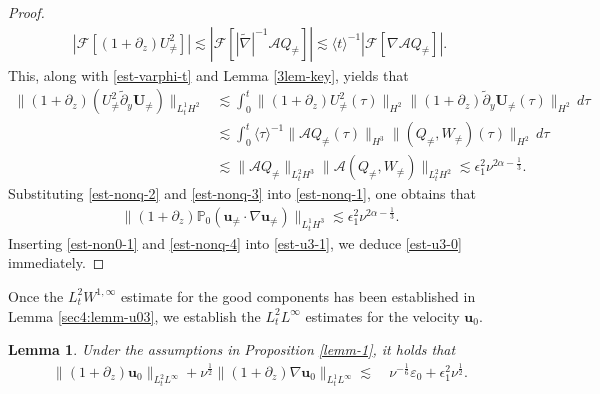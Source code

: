 \documentclass[11pt,reqno]{article}
\newtheorem{lemm}[theo]{Lemma}
\numberwithin{equation}{section}
\newcommand\PP{{\mathbb P}}
\newcommand\A{\mathcal{A}}
\newcommand\uu{\bm{u}}
\newcommand\U{\bm{U}}
\let\pa=\partial
\let\al=\alpha
\let\var=\varepsilon
\let\f=\frac
\let\ep=\epsilon
\begin{document}
\begin{proof}
\begin{align}
	|\mathcal{F}[(1+\pa_z)U^2_{\not=}]|
	\lesssim |\mathcal{F}[|\widetilde{\nabla}|^{-1}\A Q_{\not=}]|
	\lesssim \langle t\rangle^{-1}  |\mathcal{F}[\nabla\A Q_{\not=}]|.
\end{align}
This, along with %
\eqref{est-varphi-t} and Lemma \ref{3lem-key}, yields that
\begin{align}\label{est-nonq-3}
    \|(1+\pa_z)(U_{\not=}^2\tilde{\pa}_y\U_{\not=})\|_{L^1_tH^{2}}
    &\lesssim
    \int_0^t\|(1+\pa_z)U_{\not=}^2(\tau)\|_{H^{2}}
    \|(1+\pa_z)\tilde{\pa}_y\U_{\not=}(\tau)\|_{H^{2}}\,d\tau
    \nonumber
    \\
    &\lesssim 
    \int_0^t\langle \tau \rangle^{-1}\|\A Q_{\not=}(\tau)\|_{H^{3}}
    \|(Q_{\not=},W_{\not=})(\tau)\|_{H^{2}}\,d\tau
    \nonumber
    \\
    &\lesssim \|\A Q_{\not=}\|_{L^2_tH^{3}}
    \|\A(Q_{\not=},W_{\not=})\|_{L^2_tH^{2}}
    \lesssim \ep_1^2 \nu^{2\al-\f13}.
\end{align}
Substituting \eqref{est-nonq-2} and \eqref{est-nonq-3} into \eqref{est-nonq-1}, one obtains that
\begin{align}\label{est-nonq-4}
    \|(1+\pa_z)\PP_0(\uu_{\not=}\cdot\nabla\uu_{\not=})\|_{L^1_tH^{3}}
    \lesssim \ep_1^2 \nu^{2\al-\f13}.
\end{align}
Inserting \eqref{est-non0-1} and \eqref{est-nonq-4} into \eqref{est-u3-1}, we deduce \eqref{est-u3-0} immediately.
\end{proof}


Once the $L^2_tW^{1,\infty}$ estimate for the good components has been established in Lemma \ref{sec4:lemm-u03}, we establish the $L^2_tL^\infty$ estimates for the velocity $\uu_0$.
\begin{lemm}\label{sec4:lemm-u0}
    Under the assumptions in Proposition \ref{lemm-1}, it holds that%
    \begin{align}\label{est-u-0}
        \|(1+\pa_z)\uu_0\|_{L^2_tL^{\infty}}
        +\nu^{\f12}\|(1+\pa_z)\nabla \uu_0\|_{L^1_tL^\infty}
        \lesssim &~\nu^{-\f16}\var_0+\ep_1^2 \nu^{\f12}.
    \end{align}
\end{lemm}
\end{document}
